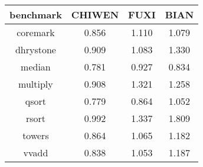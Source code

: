 \begin{table}[!htbp]
	\label{tab:ipc_result_ruo}
	\centering
	\footnotesize%
	\setlength{\tabcolsep}{4pt}%
	\renewcommand{\arraystretch}{1.2}%
	\begin{tabular}{cccc}
		\hline
		benchmark & CHIWEN & FUXI & BIAN \\%
		\hline
		coremark    & 0.856 & 1.110 & 1.079 \\
		dhrystone   & 0.909 & 1.083 & 1.330 \\
		median 		& 0.781 & 0.927 & 0.834 \\
		multiply 	& 0.908 & 1.321 & 1.258 \\
		qsort  		& 0.779 & 0.864 & 1.052 \\
		rsort  		& 0.992 & 1.337 & 1.809 \\
		towers 		& 0.864 & 1.065 & 1.182 \\
		vvadd 		& 0.838 & 1.053 & 1.187 \\
		\hline
	\end{tabular}
\end{table}

